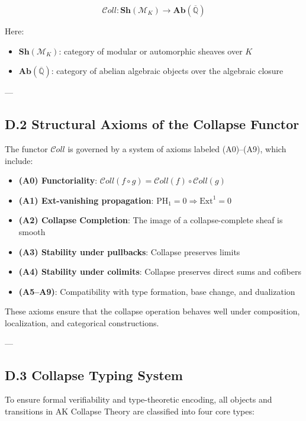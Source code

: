 \documentclass[11pt]{article}
\begin{document}
\[
\mathcal{C}oll: \mathbf{Sh}(\mathcal{M}_K) \to \mathbf{Ab}(\overline{\mathbb{Q}})
\]

Here:
\begin{itemize}
    \item \( \mathbf{Sh}(\mathcal{M}_K) \): category of modular or automorphic sheaves over \( K \)
    \item \( \mathbf{Ab}(\overline{\mathbb{Q}}) \): category of abelian algebraic objects over the algebraic closure
\end{itemize}

---

\subsection*{D.2 Structural Axioms of the Collapse Functor}

The functor \( \mathcal{C}oll \) is governed by a system of axioms labeled (A0)–(A9), which include:

\begin{itemize}
    \item \textbf{(A0) Functoriality}: \( \mathcal{C}oll(f \circ g) = \mathcal{C}oll(f) \circ \mathcal{C}oll(g) \)
    \item \textbf{(A1) Ext-vanishing propagation}: \( \mathrm{PH}_1 = 0 \Rightarrow \mathrm{Ext}^1 = 0 \)
    \item \textbf{(A2) Collapse Completion}: The image of a collapse-complete sheaf is smooth
    \item \textbf{(A3) Stability under pullbacks}: Collapse preserves limits
    \item \textbf{(A4) Stability under colimits}: Collapse preserves direct sums and cofibers
    \item \textbf{(A5–A9)}: Compatibility with type formation, base change, and dualization
\end{itemize}

These axioms ensure that the collapse operation behaves well under composition, localization, and categorical constructions.

---

\subsection*{D.3 Collapse Typing System}

To ensure formal verifiability and type-theoretic encoding, all objects and transitions in AK Collapse Theory are classified into four core types:
\end{document}
